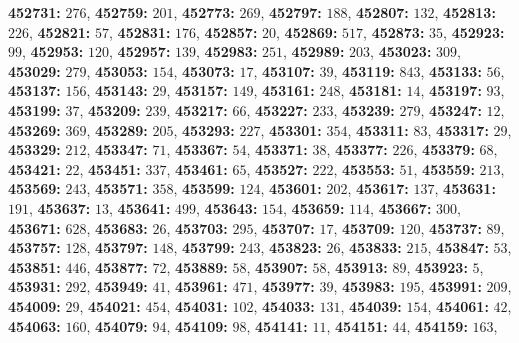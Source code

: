 \textsf{\bfseries 452731:} $276$, \textsf{\bfseries 452759:} $201$, \textsf{\bfseries 452773:} $269$, \textsf{\bfseries 452797:} $188$, \textsf{\bfseries 452807:} $132$, \textsf{\bfseries 452813:} $226$, \textsf{\bfseries 452821:} $57$, \textsf{\bfseries 452831:} $176$, \textsf{\bfseries 452857:} $20$, \textsf{\bfseries 452869:} $517$, \textsf{\bfseries 452873:} $35$, \textsf{\bfseries 452923:} $99$, \textsf{\bfseries 452953:} $120$, \textsf{\bfseries 452957:} $139$, \textsf{\bfseries 452983:} $251$, \textsf{\bfseries 452989:} $203$, \textsf{\bfseries 453023:} $309$, \textsf{\bfseries 453029:} $279$, \textsf{\bfseries 453053:} $154$, \textsf{\bfseries 453073:} $17$, \textsf{\bfseries 453107:} $39$, \textsf{\bfseries 453119:} $843$, \textsf{\bfseries 453133:} $56$, \textsf{\bfseries 453137:} $156$, \textsf{\bfseries 453143:} $29$, \textsf{\bfseries 453157:} $149$, \textsf{\bfseries 453161:} $248$, \textsf{\bfseries 453181:} $14$, \textsf{\bfseries 453197:} $93$, \textsf{\bfseries 453199:} $37$, \textsf{\bfseries 453209:} $239$, \textsf{\bfseries 453217:} $66$, \textsf{\bfseries 453227:} $233$, \textsf{\bfseries 453239:} $279$, \textsf{\bfseries 453247:} $12$, \textsf{\bfseries 453269:} $369$, \textsf{\bfseries 453289:} $205$, \textsf{\bfseries 453293:} $227$, \textsf{\bfseries 453301:} $354$, \textsf{\bfseries 453311:} $83$, \textsf{\bfseries 453317:} $29$, \textsf{\bfseries 453329:} $212$, \textsf{\bfseries 453347:} $71$, \textsf{\bfseries 453367:} $54$, \textsf{\bfseries 453371:} $38$, \textsf{\bfseries 453377:} $226$, \textsf{\bfseries 453379:} $68$, \textsf{\bfseries 453421:} $22$, \textsf{\bfseries 453451:} $337$, \textsf{\bfseries 453461:} $65$, \textsf{\bfseries 453527:} $222$, \textsf{\bfseries 453553:} $51$, \textsf{\bfseries 453559:} $213$, \textsf{\bfseries 453569:} $243$, \textsf{\bfseries 453571:} $358$, \textsf{\bfseries 453599:} $124$, \textsf{\bfseries 453601:} $202$, \textsf{\bfseries 453617:} $137$, \textsf{\bfseries 453631:} $191$, \textsf{\bfseries 453637:} $13$, \textsf{\bfseries 453641:} $499$, \textsf{\bfseries 453643:} $154$, \textsf{\bfseries 453659:} $114$, \textsf{\bfseries 453667:} $300$, \textsf{\bfseries 453671:} $628$, \textsf{\bfseries 453683:} $26$, \textsf{\bfseries 453703:} $295$, \textsf{\bfseries 453707:} $17$, \textsf{\bfseries 453709:} $120$, \textsf{\bfseries 453737:} $89$, \textsf{\bfseries 453757:} $128$, \textsf{\bfseries 453797:} $148$, \textsf{\bfseries 453799:} $243$, \textsf{\bfseries 453823:} $26$, \textsf{\bfseries 453833:} $215$, \textsf{\bfseries 453847:} $53$, \textsf{\bfseries 453851:} $446$, \textsf{\bfseries 453877:} $72$, \textsf{\bfseries 453889:} $58$, \textsf{\bfseries 453907:} $58$, \textsf{\bfseries 453913:} $89$, \textsf{\bfseries 453923:} $5$, \textsf{\bfseries 453931:} $292$, \textsf{\bfseries 453949:} $41$, \textsf{\bfseries 453961:} $471$, \textsf{\bfseries 453977:} $39$, \textsf{\bfseries 453983:} $195$, \textsf{\bfseries 453991:} $209$, \textsf{\bfseries 454009:} $29$, \textsf{\bfseries 454021:} $454$, \textsf{\bfseries 454031:} $102$, \textsf{\bfseries 454033:} $131$, \textsf{\bfseries 454039:} $154$, \textsf{\bfseries 454061:} $42$, \textsf{\bfseries 454063:} $160$, \textsf{\bfseries 454079:} $94$, \textsf{\bfseries 454109:} $98$, \textsf{\bfseries 454141:} $11$, \textsf{\bfseries 454151:} $44$, \textsf{\bfseries 454159:} $163$, 
